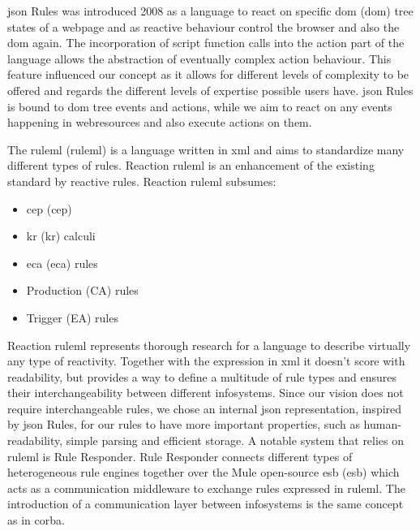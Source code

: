 \textrm{\acrshort{json} Rules}\cite{2008-Giurca_Pascalau-JSON_Rules.pdf} was introduced 2008 as a language to react on specific \textrm{\acrlong{dom} (\acrshort{dom})} tree states of a webpage and as reactive behaviour control the browser and also the \textrm{\acrshort{dom}} again.
The incorporation of script function calls into the action part of the language allows the abstraction of eventually complex action behaviour.
This feature influenced our concept as it allows for different levels of complexity to be offered and regards the different levels of expertise possible users have.
\textrm{\acrshort{json} Rules} is bound to \textrm{\acrshort{dom}} tree events and actions, while we aim to react on any events happening in \textrm{\glspl{webresource}} and also execute actions on them.

The \textrm{\acrlong{ruleml} (\acrshort{ruleml})}\cite{2006-Boley-RuleML.pdf} is a language written in \textrm{\acrshort{xml}} and aims to standardize many different types of rules.
\textrm{Reaction \acrshort{ruleml}}\cite{2012-Paschke_etal-ReactionRuleML.pdf} is an enhancement of the existing standard by reactive rules.
\textrm{Reaction \acrshort{ruleml}} subsumes:
\begin{itemize}
  \item \textrm{\acrlong{cep} (\acrshort{cep})}
  \item \textrm{\acrlong{kr} (\acrshort{kr})} calculi
  \item \textrm{\acrlong{eca} (\acrshort{eca})} rules
  \item Production (\textrm{CA}) rules
  \item Trigger (\textrm{EA}) rules
\end{itemize}
\textrm{Reaction \acrshort{ruleml}} represents thorough research for a language to describe virtually any type of reactivity.
Together with the expression in \textrm{\acrshort{xml}} it doesn't score with readability, but provides a way to define a multitude of rule types and ensures their interchangeability between different \textrm{\glspl{infosystem}}.
Since our vision does not require interchangeable rules, we chose an internal \textrm{\acrshort{json}} representation, inspired by \textrm{\acrshort{json} Rules}, for our rules to have more important properties, such as human-readability, simple parsing and efficient storage.
A notable system that relies on \textrm{\acrshort{ruleml}} is \textrm{Rule Responder}\cite{2007-Paschke_etal-RuleResponder.pdf}.
\textrm{Rule Responder} connects different types of heterogeneous rule engines together over the \textrm{Mule} open-source \textrm{\acrlong{esb} (\acrshort{esb})} which acts as a communication middleware to exchange rules expressed in \textrm{\acrshort{ruleml}}.
The introduction of a communication layer between \textrm{\glspl{infosystem}} is the same concept as in \textrm{\acrshort{corba}}.

